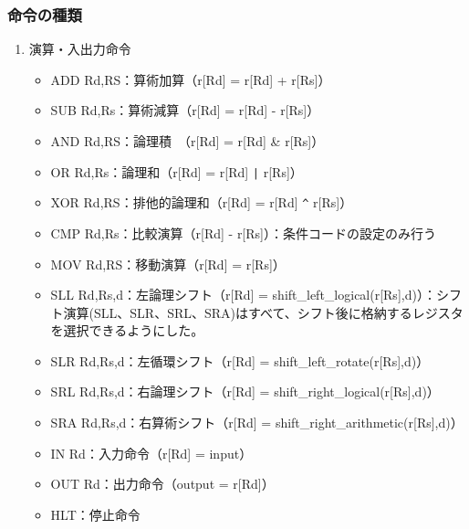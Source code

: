 \documentclass[titlepage]{jsarticle}
\begin{document}
\subsubsection{命令の種類}

\begin{enumerate}
\item 演算・入出力命令
\begin{itemize}
\item ADD Rd,RS：算術加算（r[Rd] = r[Rd] + r[Rs]）
\item SUB Rd,Rs：算術減算（r[Rd] = r[Rd] - r[Rs]）
\item AND Rd,RS：論理積　（r[Rd] = r[Rd] \& r[Rs]）
\item OR Rd,Rs：論理和（r[Rd] = r[Rd] \verb+|+ r[Rs]）

\item XOR Rd,RS：排他的論理和（r[Rd] = r[Rd] \verb|^| r[Rs]）
\item CMP Rd,Rs：比較演算（r[Rd] - r[Rs]）：条件コードの設定のみ行う
\item MOV Rd,RS：移動演算（r[Rd] = r[Rs]）
\item SLL Rd,Rs,d：左論理シフト（r[Rd] = shift\_left\_logical(r[Rs],d)）：シフト演算(SLL、SLR、SRL、SRA)はすべて、シフト後に格納するレジスタを選択できるようにした。

\item SLR Rd,Rs,d：左循環シフト（r[Rd] = shift\_left\_rotate(r[Rs],d)）
\item SRL Rd,Rs,d：右論理シフト（r[Rd] = shift\_right\_logical(r[Rs],d)）
\item SRA Rd,Rs,d：右算術シフト（r[Rd] = shift\_right\_arithmetic(r[Rs],d)）
\item IN Rd：入力命令（r[Rd] = input）

\item OUT Rd：出力命令（output = r[Rd]）
\item HLT：停止命令


\end{itemize}
\end{enumerate}
\end{document}
